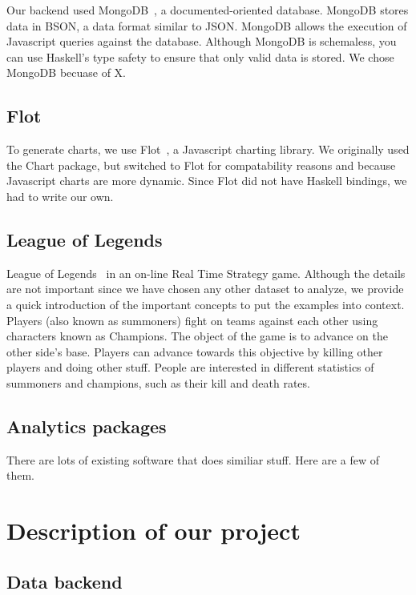 \documentclass{chi2009}
\begin{document}
Our backend used MongoDB~\cite{mongo}, a documented-oriented database. MongoDB stores data in BSON, a data format similar to JSON. MongoDB allows the execution of Javascript queries against the database. Although MongoDB is schemaless, you can use Haskell's type safety to ensure that only valid data is stored. We chose MongoDB becuase of X.

\subsection{Flot}

To generate charts, we use Flot~\cite{flot}, a Javascript charting library. We originally used the Chart package, but switched to Flot for compatability reasons and because Javascript charts are more dynamic. Since Flot did not have Haskell bindings, we had to write our own. 

\subsection{League of Legends}

League of Legends~\cite{lol} in an on-line Real Time Strategy game. Although the details are not important since we have chosen any other dataset to analyze, we provide a quick introduction of the important concepts to put the examples into context. Players (also known as summoners) fight on teams against each other using characters known as Champions. The object of the game is to advance on the other side's base. Players can advance towards this objective by killing other players and doing other stuff. People are interested in different statistics of summoners and champions, such as their kill and death rates. 

\subsection{Analytics packages}

There are lots of existing software that does similiar stuff. Here are a few of them. 

\section{Description of our project}
\label{package}

\subsection{Data backend}
\end{document}
